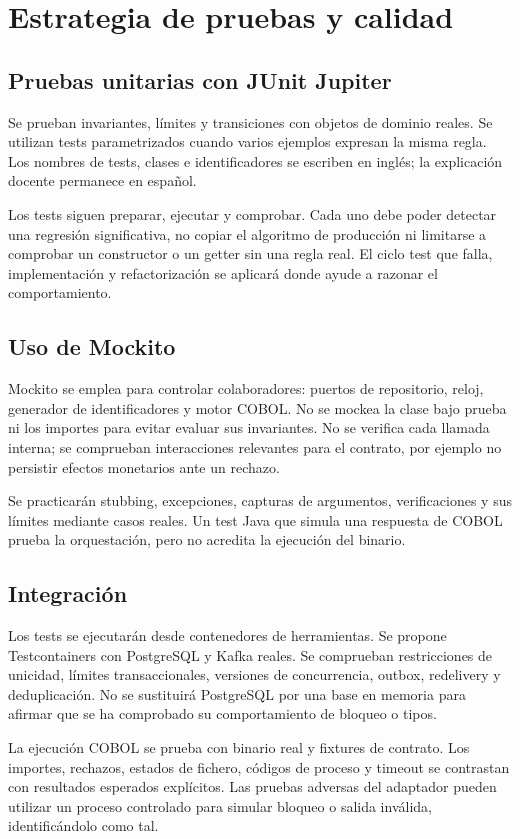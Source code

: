 \chapter{Estrategia de pruebas y calidad}
\section{Pruebas unitarias con JUnit Jupiter}
Se prueban invariantes, límites y transiciones con objetos de dominio reales. Se utilizan tests parametrizados cuando varios ejemplos expresan la misma regla. Los nombres de tests, clases e identificadores se escriben en inglés; la explicación docente permanece en español.

Los tests siguen preparar, ejecutar y comprobar. Cada uno debe poder detectar una regresión significativa, no copiar el algoritmo de producción ni limitarse a comprobar un constructor o un getter sin una regla real. El ciclo test que falla, implementación y refactorización se aplicará donde ayude a razonar el comportamiento.

\section{Uso de Mockito}
Mockito se emplea para controlar colaboradores: puertos de repositorio, reloj, generador de identificadores y motor COBOL. No se mockea la clase bajo prueba ni los importes para evitar evaluar sus invariantes. No se verifica cada llamada interna; se comprueban interacciones relevantes para el contrato, por ejemplo no persistir efectos monetarios ante un rechazo.

Se practicarán stubbing, excepciones, capturas de argumentos, verificaciones y sus límites mediante casos reales. Un test Java que simula una respuesta de COBOL prueba la orquestación, pero no acredita la ejecución del binario.

\section{Integración}
Los tests se ejecutarán desde contenedores de herramientas. Se propone Testcontainers con PostgreSQL y Kafka reales. Se comprueban restricciones de unicidad, límites transaccionales, versiones de concurrencia, outbox, redelivery y deduplicación. No se sustituirá PostgreSQL por una base en memoria para afirmar que se ha comprobado su comportamiento de bloqueo o tipos.

La ejecución COBOL se prueba con binario real y fixtures de contrato. Los importes, rechazos, estados de fichero, códigos de proceso y timeout se contrastan con resultados esperados explícitos. Las pruebas adversas del adaptador pueden utilizar un proceso controlado para simular bloqueo o salida inválida, identificándolo como tal.

